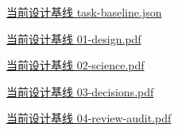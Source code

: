 \documentclass[11pt,a4paper]{article}
\begin{document}
\href{file:///D:/Agent/srp/agent/design/design-foundation-20261008/task-baseline.json}{当前设计基线 task-\allowbreak{}baseline.json}


\href{file:///D:/Agent/srp/agent/design/design-foundation-20261008/01-design.pdf}{当前设计基线 01-\allowbreak{}design.pdf}


\href{file:///D:/Agent/srp/agent/design/design-foundation-20261008/02-science.pdf}{当前设计基线 02-\allowbreak{}science.pdf}


\href{file:///D:/Agent/srp/agent/design/design-foundation-20261008/03-decisions.pdf}{当前设计基线 03-\allowbreak{}decisions.pdf}


\href{file:///D:/Agent/srp/agent/design/design-foundation-20261008/04-review-audit.pdf}{当前设计基线 04-\allowbreak{}review-\allowbreak{}audit.pdf}
\end{document}
